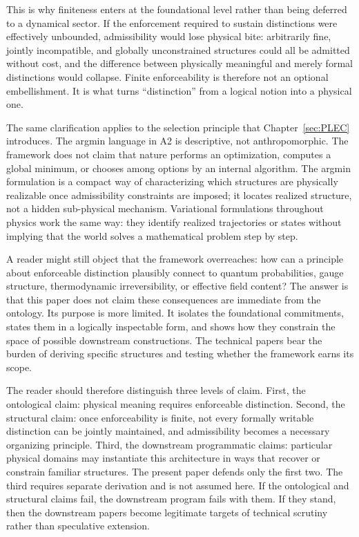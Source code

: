 \documentclass[11pt]{article}
\begin{document}
This is why finiteness enters at the foundational level rather than being deferred to a dynamical sector. If the enforcement required to sustain distinctions were effectively unbounded, admissibility would lose physical bite: arbitrarily fine, jointly incompatible, and globally unconstrained structures could all be admitted without cost, and the difference between physically meaningful and merely formal distinctions would collapse. Finite enforceability is therefore not an optional embellishment. It is what turns ``distinction'' from a logical notion into a physical one.

The same clarification applies to the selection principle that Chapter~\ref{sec:PLEC} introduces. The argmin language in A2 is descriptive, not anthropomorphic. The framework does not claim that nature performs an optimization, computes a global minimum, or chooses among options by an internal algorithm. The argmin formulation is a compact way of characterizing which structures are physically realizable once admissibility constraints are imposed; it locates realized structure, not a hidden sub-physical mechanism. Variational formulations throughout physics work the same way: they identify realized trajectories or states without implying that the world solves a mathematical problem step by step.

A reader might still object that the framework overreaches: how can a principle about enforceable distinction plausibly connect to quantum probabilities, gauge structure, thermodynamic irreversibility, or effective field content? The answer is that this paper does not claim these consequences are immediate from the ontology. Its purpose is more limited. It isolates the foundational commitments, states them in a logically inspectable form, and shows how they constrain the space of possible downstream constructions. The technical papers bear the burden of deriving specific structures and testing whether the framework earns its scope.

The reader should therefore distinguish three levels of claim. First, the ontological claim: physical meaning requires enforceable distinction. Second, the structural claim: once enforceability is finite, not every formally writable distinction can be jointly maintained, and admissibility becomes a necessary organizing principle. Third, the downstream programmatic claims: particular physical domains may instantiate this architecture in ways that recover or constrain familiar structures. The present paper defends only the first two. The third requires separate derivation and is not assumed here. If the ontological and structural claims fail, the downstream program fails with them. If they stand, then the downstream papers become legitimate targets of technical scrutiny rather than speculative extension.
\end{document}
